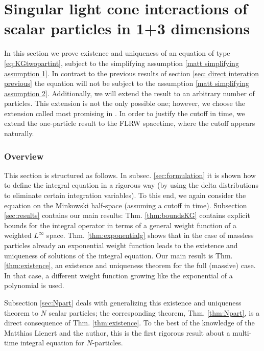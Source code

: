\documentclass[b5paper,draft,openbib,12pt]{memoir}
\begin{document}
\section{Singular light cone interactions of scalar particles in 1+3 dimensions}\label{sec:KG lightcones}
In this section we prove existence and uniqueness
of an equation of type \eqref{eq:KGtwopartint},
subject to the simplifying assumption 
\eqref{matt simplifying assumption 1}. In contrast to 
the previous results of section \ref{sec: direct interation previous} 
the equation will not be subject to the assumption
\eqref{matt simplifying assumption 2}. Additionally, we will extend the 
result to an arbitrary number of particles. This extension 
is not the only possible one; however, we choose the 
extension called most promising in \cite{direct_interaction_quantum}.
In order to justify the cutoff in time, we extend the one-particle 
result to the FLRW spacetime, where the cutoff appears naturally.




\subsubsection{Overview}

This section is structured as follows. In subsec. \ref{sec:formulation} 
it is shown how to define the integral equation in a rigorous way 
(by using the delta distributions to eliminate certain integration 
variables). To this end, we again consider the equation on the 
Minkowski half-space (assuming a cutoff in time). Subsection 
\ref{sec:results} contains our main results: Thm. \ref{thm:boundsKG} 
contains explicit bounds for the integral operator in terms of a 
general weight function of a weighted $L^\infty$ space. Thm. 
\ref{thm:exponentialg} shows that in the case of massless particles 
already an exponential weight function leads to the existence and 
uniqueness of solutions of the integral equation. Our main result 
is Thm. \ref{thm:existence}, an existence and uniqueness theorem 
for the full (massive) case. In that case, a different weight 
function growing like the exponential of a polynomial is used. 

Subsection \ref{sec:Npart} deals with generalizing this existence and 
uniqueness theorem to $N$ scalar particles; the corresponding 
theorem, Thm. \ref{thm:Npart}, is a direct consequence of Thm.
\ref{thm:existence}. To the best of the knowledge of 
the Matthias Lienert and the author, this is the 
first rigorous result about a multi-time integral equation for 
$N$-particles. 
\end{document}
